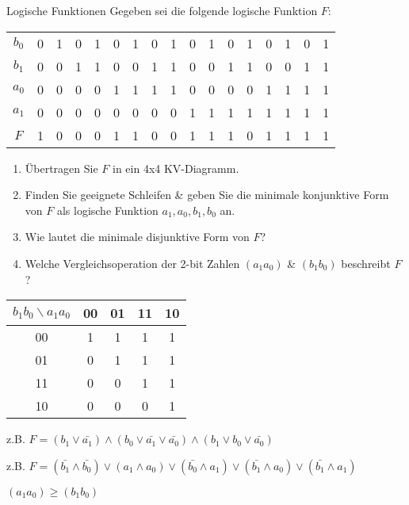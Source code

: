\documentclass{exercisesheet}
\begin{document}
\begin{exercise*}{Logische Funktionen}
  Gegeben sei die folgende logische Funktion $F$:
  \begin{center}
    \begin{tabular}{c|cccc cccc cccc cccc}
      $b_0$ & 0 & 1 & 0 & 1 & 0 & 1 & 0 & 1 & 0 & 1 & 0 & 1 & 0 & 1 & 0 & 1 \\
      $b_1$ & 0 & 0 & 1 & 1 & 0 & 0 & 1 & 1 & 0 & 0 & 1 & 1 & 0 & 0 & 1 & 1 \\
      $a_0$ & 0 & 0 & 0 & 0 & 1 & 1 & 1 & 1 & 0 & 0 & 0 & 0 & 1 & 1 & 1 & 1 \\
      $a_1$ & 0 & 0 & 0 & 0 & 0 & 0 & 0 & 0 & 1 & 1 & 1 & 1 & 1 & 1 & 1 & 1 \\
      \hline
      $F$   & 1 & 0 & 0 & 0 & 1 & 1 & 0 & 0 & 1 & 1 & 1 & 0 & 1 & 1 & 1 & 1 \\
    \end{tabular}
  \end{center}
  \begin{enumerate}
    \item Übertragen Sie $F$ in ein 4x4 KV-Diagramm.
    \item Finden Sie geeignete Schleifen \& geben Sie die minimale konjunktive Form von $F$ als logische Funktion $a_1, a_0, b_1, b_0$ an.
    \item Wie lautet die minimale disjunktive Form von $F$?
    \item Welche Vergleichsoperation der 2-bit Zahlen $(a_1a_0)$ \& $(b_1b_0)$ beschreibt $F$?
  \end{enumerate}
\end{exercise*}

\begin{solution}
  \item
  \begin{tabular}{c|cccc}
    $b_1b_0 \backslash a_1a_0$ & 00 & 01 & 11 & 10 \\
    \hline
    00                         & 1  & 1  & 1  & 1  \\
    01                         & 0  & 1  & 1  & 1  \\
    11                         & 0  & 0  & 1  & 1  \\
    10                         & 0  & 0  & 0  & 1  \\
  \end{tabular}
  \item z.B. $F = (b_1 \lor \bar{a_1}) \land (b_0\lor \bar{a_1}\lor \bar{a_0}) \land (b_1\lor b_0\lor\bar{a_0})$
  \item z.B. $F = (\bar{b_1}\land\bar{b_0}) \lor (a_1\land a_0) \lor (\bar{b_0}\land a_1) \lor (\bar{b_1}\land a_0)\lor(\bar{b_1}\land a_1)$
  \item $(a_1a_0) \geq (b_1b_0)$
\end{solution}
\end{document}
